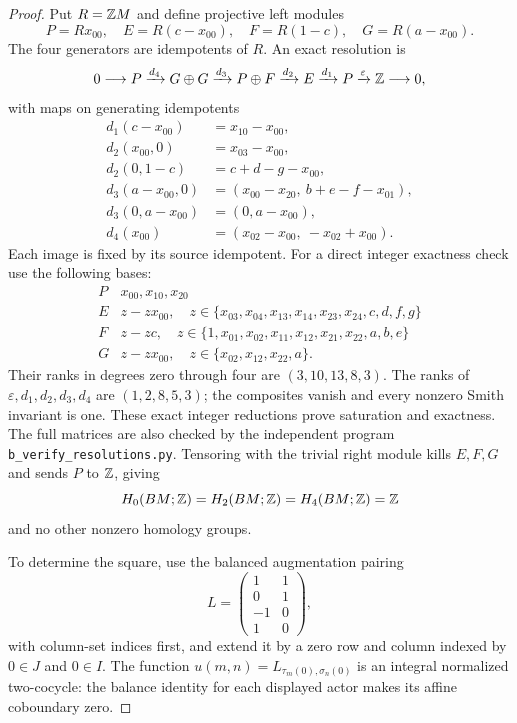 \begin{proof}
Put $R=\mathbb Z M$ and define projective left modules
\[
 P=Rx_{00},\quad E=R(c-x_{00}),\quad
 F=R(1-c),\quad G=R(a-x_{00}).
\]
The four generators are idempotents of $R$.  An exact resolution is
\[
0\longrightarrow P\xrightarrow{d_4}G\oplus G
 \xrightarrow{d_3}P\oplus F\xrightarrow{d_2}E
 \xrightarrow{d_1}P\xrightarrow{\varepsilon}\mathbb Z
 \longrightarrow0,
\]
with maps on generating idempotents
\[
\begin{aligned}
d_1(c-x_{00})&=x_{10}-x_{00},\\
d_2(x_{00},0)&=x_{03}-x_{00},\\
d_2(0,1-c)&=c+d-g-x_{00},\\
d_3(a-x_{00},0)&=(x_{00}-x_{20},\ b+e-f-x_{01}),\\
d_3(0,a-x_{00})&=(0,a-x_{00}),\\
d_4(x_{00})&=(x_{02}-x_{00},\ -x_{02}+x_{00}).
\end{aligned}
\]
Each image is fixed by its source idempotent.  For a direct integer
exactness check use the following bases:
\[
\begin{array}{c|l}
P&x_{00},x_{10},x_{20}\\
E&z-zx_{00},\quad
 z\in\{x_{03},x_{04},x_{13},x_{14},x_{23},x_{24},c,d,f,g\}\\
F&z-zc,\quad
 z\in\{1,x_{01},x_{02},x_{11},x_{12},x_{21},x_{22},a,b,e\}\\
G&z-zx_{00},\quad z\in\{x_{02},x_{12},x_{22},a\}.
\end{array}
\]
Their ranks in degrees zero through four are $(3,10,13,8,3)$.
The ranks of $\varepsilon,d_1,d_2,d_3,d_4$ are $(1,2,8,5,3)$;
the composites vanish and every nonzero Smith invariant is one.
These exact integer reductions prove saturation and exactness.
The full matrices are also checked by the independent program
\texttt{b\_verify\_resolutions.py}.
Tensoring with the trivial right module kills $E,F,G$ and sends
$P$ to $\mathbb Z$, giving
\[
 H_0(BM;\mathbb Z)=H_2(BM;\mathbb Z)=H_4(BM;\mathbb Z)=\mathbb Z
\]
and no other nonzero homology groups.

To determine the square, use the balanced augmentation pairing
\[
 L=\begin{pmatrix}1&1\\0&1\\-1&0\\1&0\end{pmatrix},
\]
with column-set indices first, and extend it by a zero row and
column indexed by $0\in J$ and $0\in I$.
The function $u(m,n)=L_{\tau_m(0),\sigma_n(0)}$ is an integral
normalized two-cocycle: the balance identity for each displayed
actor makes its affine coboundary zero.


\end{proof}
